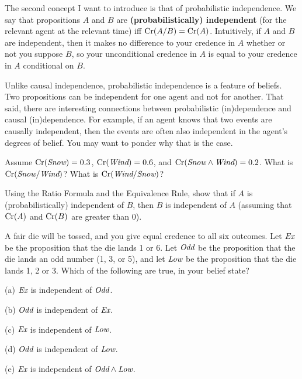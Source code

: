 The second concept I want to introduce is that of probabilistic
independence. We say that propositions $A$ and $B$ are
\textbf{(probabilistically) independent} (for the relevant agent at
the relevant time) iff $\text{Cr}(A/B) = \text{Cr}(A)$. Intuitively, if $A$ and $B$
are independent, then it makes no difference to your credence in $A$
whether or not you suppose $B$, so your unconditional credence in $A$
is equal to your credence in $A$ conditional on $B$.

Unlike causal independence, probabilistic independence is a feature of beliefs.
Two propositions can be independent for one agent and not for another. That
said, there are interesting connections between probabilistic (in)dependence and
causal (in)dependence. For example, if an agent knows that two events are
causally independent, then the events are often also independent in the agent's
degrees of belief. You may want to ponder why that is the case.

\begin{exercise}{1}
  Assume $\text{Cr}(\emph{Snow}) = 0.3$, $\text{Cr}(\emph{Wind}) = 0.6$, and $\text{Cr}(\emph{Snow} \land
  \emph{Wind}) = 0.2$. What is $\text{Cr}(\emph{Snow}/\emph{Wind})$? What is $\text{Cr}(\emph{Wind}/\emph{Snow})$? 
\end{exercise}

\begin{exercise}{2}
  Using the Ratio Formula and the Equivalence Rule, show that if $A$ is
  (probabilistically) independent of $B$, then $B$ is independent of $A$
  (assuming that $\text{Cr}(A)$ and $\text{Cr}(B)$ are greater than 0).
\end{exercise}

\begin{exercise}{2}
  A fair die will be tossed, and you give equal credence to all six
  outcomes. Let $\emph{Ex}$ be the proposition that the die lands 1 or
  6. Let $\emph{Odd}$ be the proposition that the die lands an odd number (1, 3,
  or 5), and let $\emph{Low}$ be the proposition that the die lands 1, 2 or 3.
  Which of the following are true, in your belief state?
  \begin{exlist}
  \item[(a)] $\emph{Ex}$ is independent of $\emph{Odd}$. 
  \item[(b)] $\emph{Odd}$ is independent of $\emph{Ex}$. 
  \item[(c)] $\emph{Ex}$ is independent of $\emph{Low}$.
  \item[(d)] $\emph{Odd}$ is independent of $\emph{Low}$.
  \item[(e)] $\emph{Ex}$ is independent of $\emph{Odd} \land \emph{Low}$.
  \end{exlist}
\end{exercise}

